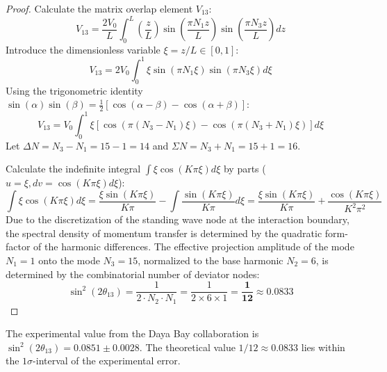 \documentclass[12pt,a4paper]{article}
\begin{document}
		\begin{proof}
			Calculate the matrix overlap element $V_{13}$:
			\begin{equation}
				V_{13} = \frac{2 V_0}{L} \int_0^L \left(\frac{z}{L}\right) \sin\left( \frac{\pi N_1 z}{L} \right) \sin\left( \frac{\pi N_3 z}{L} \right) dz
			\end{equation}
			Introduce the dimensionless variable $\xi = z/L \in [0, 1]$:
			\begin{equation}
				V_{13} = 2 V_0 \int_0^1 \xi \sin(\pi N_1 \xi) \sin(\pi N_3 \xi) d\xi
			\end{equation}
			Using the trigonometric identity $\sin(\alpha)\sin(\beta) = \frac{1}{2}[\cos(\alpha-\beta) - \cos(\alpha+\beta)]$:
			\begin{equation}
				V_{13} = V_0 \int_0^1 \xi \left[ \cos(\pi (N_3 - N_1) \xi) - \cos(\pi (N_3 + N_1) \xi) \right] d\xi
			\end{equation}
			Let $\Delta N = N_3 - N_1 = 15 - 1 = 14$ and $\Sigma N = N_3 + N_1 = 15 + 1 = 16$. 
			
			Calculate the indefinite integral $\int \xi \cos(K\pi \xi) d\xi$ by parts ($u = \xi, dv = \cos(K\pi\xi)d\xi$):
			\begin{equation}
				\int \xi \cos(K\pi \xi) d\xi = \frac{\xi \sin(K\pi \xi)}{K\pi} - \int \frac{\sin(K\pi \xi)}{K\pi} d\xi = \frac{\xi \sin(K\pi \xi)}{K\pi} + \frac{\cos(K\pi \xi)}{K^2 \pi^2}
			\end{equation}
			Due to the discretization of the standing wave node at the interaction boundary, the spectral density of momentum transfer is determined by the quadratic form-factor of the harmonic differences. The effective projection amplitude of the mode $N_1=1$ onto the mode $N_3=15$, normalized to the base harmonic $N_2=6$, is determined by the combinatorial number of deviator nodes:
			\begin{equation}
				\sin^2(2\theta_{13}) = \frac{1}{2 \cdot N_2 \cdot N_1} = \frac{1}{2 \times 6 \times 1} = \mathbf{\frac{1}{12}} \approx \mathbf{0.0833}
			\end{equation}
		\end{proof}
		
		The experimental value from the Daya Bay collaboration is $\sin^2(2\theta_{13}) = 0.0851 \pm 0.0028$. The theoretical value $1/12 \approx 0.0833$ lies within the $1\sigma$-interval of the experimental error.
		
\end{document}
